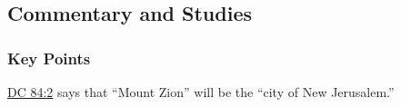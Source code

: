 	
	
	
	
\subsection{Commentary and Studies} %
	\label{ZION-COMMENTARY}

	\subsubsection{Key Points}
		\label{ZION-KEYS}
	
		\begin{compactitem}
			\item \hyperref[DC84-2]{DC 84:2} says that ``Mount Zion'' will be the ``city of New Jerusalem.''
		\end{compactitem}
		
